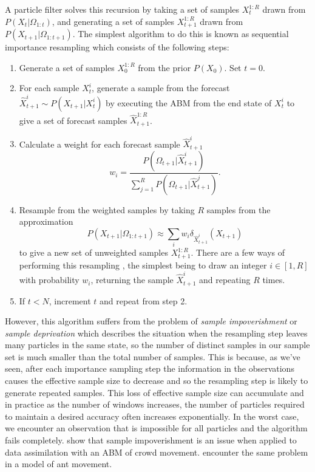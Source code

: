 \documentclass{article}
\begin{document}
A particle filter solves this recursion by taking a set of samples $X_t^{1:R}$ drawn from $P(X_t|\Omega_{1:t})$, and generating a set of samples  $X_{t+1}^{1:R}$ drawn from $P(X_{t+1}|\Omega_{1:t+1})$. The simplest algorithm to do this is known as sequential importance resampling which consists of the following steps:
\begin{enumerate}
\item Generate a set of samples $X^{1:R}_0$ from the prior $P(X_0)$. Set $t=0$.

\item For each sample $X_t^i$, generate a sample from the forecast $\hat{X}_{t+1}^i \sim P(X_{t+1}|X^i_t)$ by executing the ABM from the end state of $X^i_t$ to give a set of forecast samples $\hat{X}^{1:R}_{t+1}$.

\item Calculate a weight for each forecast sample $\hat{X}_{t+1}^i$
\[
w_i = \frac{P(\Omega_{t+1}|\hat{X}_{t+1}^i)}{\sum_{j=1}^R P(\Omega_{t+1}|\hat{X}_{t+1}^j)}.
\]

\item Resample from the weighted samples by taking $R$ samples from the approximation
\begin{equation}
P(X_{t+1}|\Omega_{1:t+1}) \approx  \sum_i w_i\delta_{\hat{X}_{t+1}^i}\left(X_{t+1}\right)
\label{importanceApprox}
\end{equation}
to give a new set of unweighted samples $X^{1:R}_{t+1}$. There are a few ways of performing this resampling \citep{douc2005comparison}, the simplest being to draw an integer $i\in[1,R]$ with probability $w_i$, returning the sample $\hat{X}_{t+1}^i$ and repeating $R$ times.

\item If $t<N$, increment $t$ and repeat from step 2.

\end{enumerate}

However, this algorithm suffers from the problem of \textit{sample impoverishment} \citep{li2014fight} or \textit{sample deprivation} which describes the situation when the resampling step leaves many particles in the same state, so the number of distinct samples in our sample set is much smaller than the total number of samples. This is because, as we've seen, after each importance sampling step the information in the observations causes the effective sample size to decrease and so the resampling step is likely to generate repeated samples. This loss of effective sample size can accumulate and in practice as the number of windows increases, the number of particles required to maintain a desired accuracy often increases exponentially. In the worst case, we encounter an observation that is impossible for all particles and the algorithm fails completely. \citet{malleson_simulating_2020} show that sample impoverishment is an issue when applied to data assimilation with an ABM of crowd movement. \citet{khan2003efficient} encounter the same problem in a model of ant movement.
\end{document}
